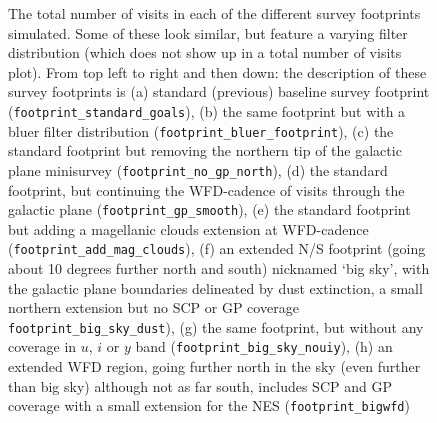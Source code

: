 \begin{figure}
\caption{The total number of visits in each of the different survey footprints simulated. Some of these look similar, but feature a varying filter distribution (which does not show up in a total number of visits plot). From top left to right and then down: the description of these survey footprints is 
(a) standard (previous) baseline survey footprint ({\tt footprint\_standard\_goals}), 
(b) the same footprint but with a bluer filter distribution ({\tt footprint\_bluer\_footprint}), 
(c) the standard footprint but removing the northern tip of the galactic plane minisurvey ({\tt footprint\_no\_gp\_north}),  
(d) the standard footprint, but continuing the WFD-cadence of visits through the galactic plane ({\tt footprint\_gp\_smooth}),  
(e) the standard footprint but adding a magellanic clouds extension at WFD-cadence ({\tt footprint\_add\_mag\_clouds}),  
(f) an extended N/S footprint (going about 10 degrees further north and south) nicknamed `big sky', with the galactic plane boundaries delineated by dust extinction, a small northern extension but no SCP or GP coverage {\tt footprint\_big\_sky\_dust}), 
 (g) the same footprint, but without any coverage in $u$, $i$ or $y$ band ({\tt footprint\_big\_sky\_nouiy}),
 (h) an extended WFD region, going further north in the sky (even further than big sky) although not as far south, includes SCP and GP coverage with a small extension for the NES ({\tt footprint\_bigwfd})
}
\end{figure}
